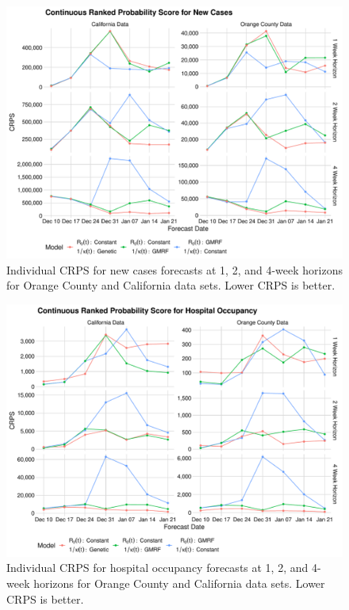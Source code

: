 \begin{figure}
    \centering
    \includegraphics[width=1.0\columnwidth]{real_data_crps_comparison_data_new_cases_plot}
    \caption{Individual CRPS for new cases forecasts at 1, 2, and 4-week horizons for Orange County and California data sets. Lower CRPS is better.}
    \label{ch_5:fig:real_data_crps_comparison_data_new_cases_plot}
\end{figure}

\begin{figure}
    \centering
    \includegraphics[width=1.0\columnwidth]{real_data_crps_comparison_data_hospitalizations_plot}
    \caption{Individual CRPS for hospital occupancy forecasts at 1, 2, and 4-week horizons for Orange County and California data sets. Lower CRPS is better.}
    \label{ch_5:fig:real_data_crps_comparison_data_hospitalizations_plot}
\end{figure}

